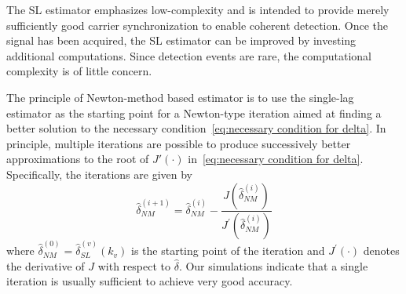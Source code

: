 The SL estimator emphasizes low-complexity  and is intended
to provide merely sufficiently good carrier synchronization to enable coherent detection.
Once the signal has been acquired, the SL estimator can be improved by 
investing additional computations. Since detection events are rare, the computational
complexity is of little concern.

The principle of Newton-method based estimator is to use the
single-lag estimator as the starting point for a Newton-type iteration  
aimed at finding a better solution to the necessary condition~\eqref{eq:necessary condition for delta}. 
In principle, multiple iterations are possible to produce successively better approximations to the root of
$J'(\cdot)$ in~\eqref{eq:necessary condition for delta}.
Specifically, the iterations are given by
\begin{equation}
  \label{eq:iter_NM_est}
  \hat{\delta}_{NM}^{(i+1)}=\hat{\delta}_{NM}^{(i)}-
  \frac{J(\hat{\delta}_{NM}^{(i)})}{J^\prime(\hat{\delta}_{NM}^{(i)})}
\end{equation}
where $\hat{\delta}_{NM}^{(0)}=\hat{\delta}^{(v)}_{SL}(k_v)$ is the
starting point of the iteration and
$J^\prime(\cdot)$ denotes the derivative of $J$ with respect to $\hat{\delta}$. 
Our simulations indicate that  a single iteration is usually sufficient to achieve very good accuracy.


